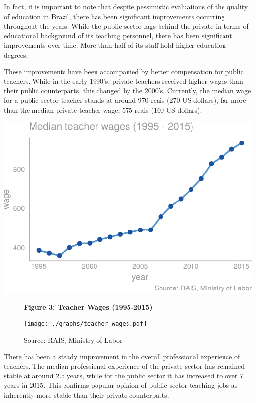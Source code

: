 \documentclass[12pt,]{article}
\begin{document}
In fact, it is important to note that despite pessimistic evaluations of
the quality of education in Brazil, there has been significant
improvements occurring throughout the years. While the public sector
lags behind the private in terms of educational background of its
teaching personnel, there has been significant improvements over time.
More than half of its staff hold higher education degrees.

These improvements have been accompanied by better compensation for
public teachers. While in the early 1990's, private teachers received
higher wages than their public counterparts, this changed by the 2000's.
Currently, the median wage for a public sector teacher stands at around
970 reais (270 US dollars), far more than the median private teacher
wage, 575 reais (160 US dollars).

\begin{center}\includegraphics{dissertation_files/figure-latex/unnamed-chunk-19-1} \end{center}

\begin{figure}
    \centering
    \textbf{\small Figure 3: Teacher Wages (1995-2015)}\par\medskip
    \texttt{[image: ./graphs/teacher\_wages.pdf]}
    \caption*{\footnotesize \hfill Source: RAIS, Ministry of Labor}
\end{figure}

There has been a steady improvement in the overall professional
experience of teachers. The median professional experience of the
private sector has remained stable at around 2.5 years, while for the
public sector it has increased to over 7 years in 2015. This confirms
popular opinion of public sector teaching jobs as inherently more stable
than their private counterparts.
\end{document}

